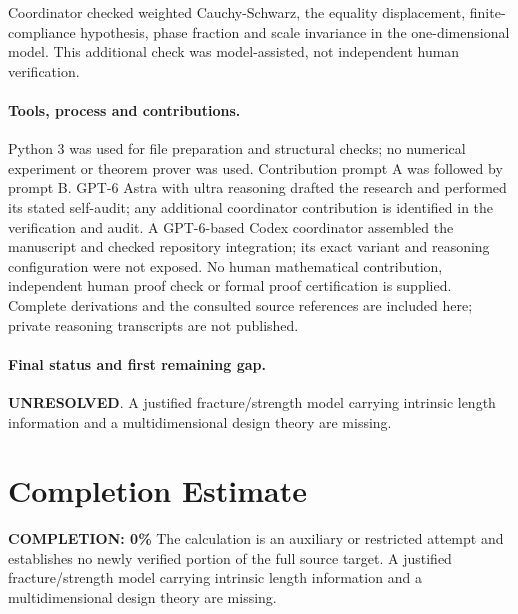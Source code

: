 \documentclass[11pt]{article}
\begin{document}
Coordinator checked weighted Cauchy-Schwarz, the equality displacement, finite-compliance hypothesis, phase fraction and scale invariance in the one-dimensional model. This additional check was model-assisted, not independent human verification.

\paragraph{Tools, process and contributions.}
Python 3 was used for file preparation and structural checks; no numerical experiment or theorem prover was used. Contribution prompt A was followed by prompt B. GPT-6 Astra with ultra reasoning drafted the research and performed its stated self-audit; any additional coordinator contribution is identified in the verification and audit. A GPT-6-based Codex coordinator assembled the manuscript and checked repository integration; its exact variant and reasoning configuration were not exposed. No human mathematical contribution, independent human proof check or formal proof certification is supplied. Complete derivations and the consulted source references are included here; private reasoning transcripts are not published.

\paragraph{Final status and first remaining gap.}
\textbf{UNRESOLVED}. A justified fracture/strength model carrying intrinsic length information and a multidimensional design theory are missing.

\section{Completion Estimate}
\noindent\textbf{COMPLETION: 0\%}
The calculation is an auxiliary or restricted attempt and establishes no newly verified portion of the full source target. A justified fracture/strength model carrying intrinsic length information and a multidimensional design theory are missing.
\end{document}
